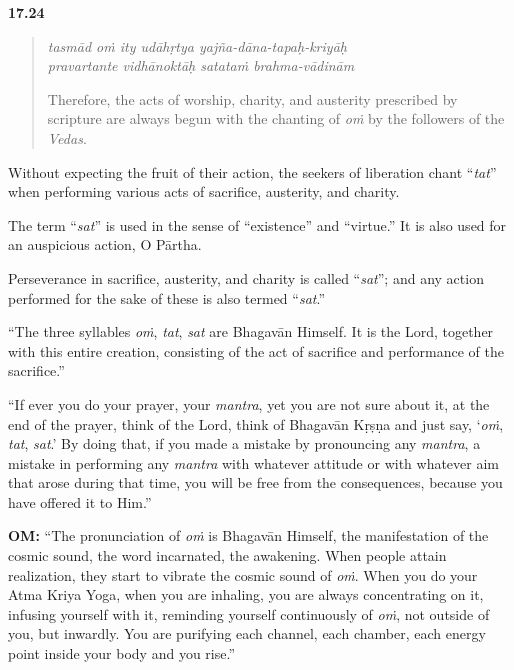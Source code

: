 \par\noindent\textbf{17.24}\par
\begin{verse}
\textit{tasmād oṁ ity udāhṛtya yajña-dāna-tapaḥ-kriyāḥ} \\
\textit{pravartante vidhānoktāḥ satataṁ brahma-vādinām}

\noindent Therefore, the acts of worship, charity, and austerity prescribed by scripture are always begun with the chanting of \textit{oṁ} by the followers of the \textit{Vedas}.
\end{verse}
\par


{Without expecting the fruit of their action, the seekers of liberation chant \enquote{\textit{tat}} when performing various acts of sacrifice, austerity, and charity.}

{The term \enquote{\textit{sat}} is used in the sense of \enquote{existence} and \enquote{virtue.} It is also used for an auspicious action, O Pārtha.}

{Perseverance in sacrifice, austerity, and charity is called \enquote{\textit{sat}}; and any action performed for the sake of these is also termed \enquote{\textit{sat}.}}

\enquote{The three syllables \textit{oṁ}, \textit{tat}, \textit{sat} are Bhagavān Himself. It is the Lord, together with this entire creation, consisting of the act of sacrifice and performance of the sacrifice.}

\enquote{If ever you do your prayer, your \textit{mantra}, yet you are not sure about it, at the end of the prayer, think of the Lord, think of Bhagavān Kṛṣṇa and just say, \enquote{\textit{oṁ}, \textit{tat}, \textit{sat}.} By doing that, if you made a mistake by pronouncing any \textit{mantra}, a mistake in performing any \textit{mantra} with whatever attitude or with whatever aim that arose during that time, you will be free from the consequences, because you have offered it to Him.}


\textbf{OṀ:} \enquote{The pronunciation of \textit{oṁ} is Bhagavān Himself, the manifestation of the cosmic sound, the word incarnated, the awakening. When people attain realization, they start to vibrate the cosmic sound of \textit{oṁ}. When you do your Atma Kriya Yoga, when you are inhaling, you are always concentrating on it, infusing yourself with it, reminding yourself continuously of \textit{oṁ}, not outside of you, but inwardly. You are purifying each channel, each chamber, each energy point inside your body and you rise.}

